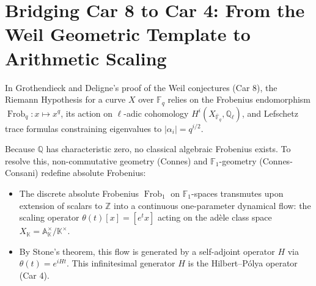 \documentclass[11pt,a4paper]{article}
\begin{document}
\section{Bridging Car 8 to Car 4: From the Weil Geometric Template to Arithmetic Scaling}
In Grothendieck and Deligne's proof of the Weil conjectures (Car 8), the Riemann Hypothesis for a curve $X$ over $\mathbb{F}_q$ relies on the Frobenius endomorphism $\operatorname{Frob}_q: x \mapsto x^q$, its action on $\ell$-adic cohomology $H^i(X_{\bar{\mathbb{F}}_q}, \mathbb{Q}_\ell)$, and Lefschetz trace formulas constraining eigenvalues to $|\alpha_i| = q^{i/2}$.

Because $\mathbb{Q}$ has characteristic zero, no classical algebraic Frobenius exists. To resolve this, non-commutative geometry (Connes) and $\mathbb{F}_1$-geometry (Connes-Consani) redefine absolute Frobenius:
\begin{itemize}
    \item The discrete absolute Frobenius $\operatorname{Frob}_1$ on $\mathbb{F}_1$-spaces transmutes upon extension of scalars to $\mathbb{Z}$ into a continuous one-parameter dynamical flow: the scaling operator $\theta(t)[x] = [e^t x]$ acting on the ad\`{e}le class space $X_{\mathbb{K}} = \mathbb{A}_{\mathbb{K}}^\times / \mathbb{K}^\times$.
    \item By Stone's theorem, this flow is generated by a self-adjoint operator $H$ via $\theta(t) = e^{iHt}$. This infinitesimal generator $H$ is the Hilbert--P\'{o}lya operator (Car 4).
\end{itemize}
\end{document}
